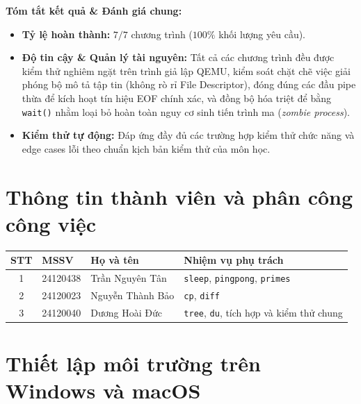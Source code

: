 \documentclass[12pt,a4paper]{article}
\begin{document}
\begin{notebox}
\textbf{Tóm tắt kết quả \& Đánh giá chung:}
\begin{itemize}
  \item \textbf{Tỷ lệ hoàn thành:} $7/7$ chương trình ($100\%$ khối lượng yêu cầu).
  \item \textbf{Độ tin cậy \& Quản lý tài nguyên:} Tất cả các chương trình đều được kiểm thử nghiêm ngặt trên trình giả lập QEMU, kiểm soát chặt chẽ việc giải phóng bộ mô tả tập tin (không rò rỉ File Descriptor), đóng đúng các đầu pipe thừa để kích hoạt tín hiệu EOF chính xác, và đồng bộ hóa triệt để bằng \texttt{wait()} nhằm loại bỏ hoàn toàn nguy cơ sinh tiến trình ma (\textit{zombie process}).
  \item \textbf{Kiểm thử tự động:} Đáp ứng đầy đủ các trường hợp kiểm thử chức năng và edge cases lỗi theo chuẩn kịch bản kiểm thử của môn học.
\end{itemize}
\end{notebox}

\section{Thông tin thành viên và phân công công việc}

\begin{center}
\small
\begin{tabularx}{\textwidth}{c p{} p{} X}
\toprule
\rowcolor{tableheader}
\textbf{STT} & \textbf{MSSV} & \textbf{Họ và tên} & \textbf{Nhiệm vụ phụ trách} \\
\midrule
1 & 24120438 & Trần Nguyên Tân & \texttt{sleep}, \texttt{pingpong}, \texttt{primes} \\
2 & 24120023 & Nguyễn Thành Bảo & \texttt{cp}, \texttt{diff} \\
3 & 24120040 & Dương Hoài Đức & \texttt{tree}, \texttt{du}, tích hợp và kiểm thử chung \\
\bottomrule
\end{tabularx}
\end{center}

\section{Thiết lập môi trường trên Windows và macOS}
\end{document}

